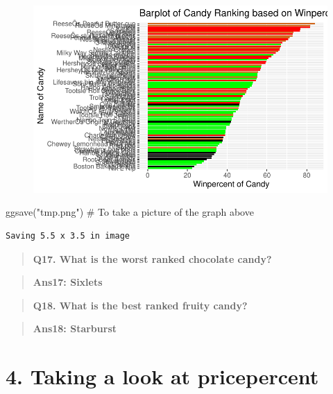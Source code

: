 \documentclass[
  letterpaper,
  DIV=11,
  numbers=noendperiod]{scrartcl}
\newenvironment{Shaded}{\begin{snugshade}}{\end{snugshade}}
\newcommand{\CommentTok}[1]{\textcolor[rgb]{0.37,0.37,0.37}{#1}}
\newcommand{\FunctionTok}[1]{\textcolor[rgb]{0.28,0.35,0.67}{#1}}
\newcommand{\NormalTok}[1]{\textcolor[rgb]{0.00,0.23,0.31}{#1}}
\newcommand{\StringTok}[1]{\textcolor[rgb]{0.13,0.47,0.30}{#1}}
\begin{document}
\begin{figure}[H]

{\centering \includegraphics{class10_files/figure-pdf/unnamed-chunk-20-1.pdf}

}

\end{figure}

\begin{Shaded}
\begin{Highlighting}[]
\FunctionTok{ggsave}\NormalTok{(}\StringTok{"tmp.png"}\NormalTok{) }\CommentTok{\# To take a picture of the graph above}
\end{Highlighting}
\end{Shaded}

\begin{verbatim}
Saving 5.5 x 3.5 in image
\end{verbatim}

\begin{quote}
\textbf{Q17. What is the worst ranked chocolate candy?}
\end{quote}

\begin{quote}
\textbf{Ans17: Sixlets}
\end{quote}

\begin{quote}
\textbf{Q18. What is the best ranked fruity candy?}
\end{quote}

\begin{quote}
\textbf{Ans18: Starburst}
\end{quote}

\hypertarget{taking-a-look-at-pricepercent}{%
\section{4. Taking a look at
pricepercent}\label{taking-a-look-at-pricepercent}}
\end{document}
